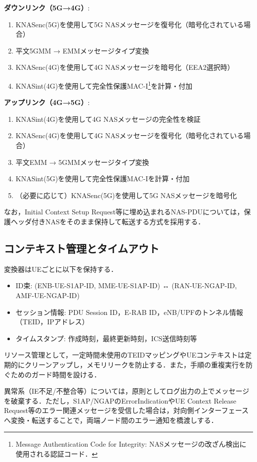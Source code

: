 \textbf{ダウンリンク（5G→4G）}:
\begin{enumerate}
\item KNASenc(5G)を使用して5G NASメッセージを復号化（暗号化されている場合）
\item 平文5GMM → EMMメッセージタイプ変換
\item KNASenc(4G)を使用して4G NASメッセージを暗号化（EEA2選択時）
\item KNASint(4G)を使用して完全性保護MAC-I\footnote{Message Authentication Code for Integrity: NASメッセージの改ざん検出に使用される認証コード．}を計算・付加
\end{enumerate}

\textbf{アップリンク（4G→5G）}:
\begin{enumerate}
\item KNASint(4G)を使用して4G NASメッセージの完全性を検証
\item KNASenc(4G)を使用して4G NASメッセージを復号化（暗号化されている場合）
\item 平文EMM → 5GMMメッセージタイプ変換
\item KNASint(5G)を使用して完全性保護MAC-Iを計算・付加
\item （必要に応じて）KNASenc(5G)を使用して5G NASメッセージを暗号化
\end{enumerate}

なお，Initial Context Setup Request等に埋め込まれるNAS-PDUについては，保護ヘッダ付きNASをそのまま保持して転送する方式を採用する．

\subsection{コンテキスト管理とタイムアウト}
\label{subsec:context_management}
変換器はUEごとに以下を保持する．
\begin{itemize}
  \item ID束: (ENB-UE-S1AP-ID, MME-UE-S1AP-ID) ↔ (RAN-UE-NGAP-ID, AMF-UE-NGAP-ID)
  \item セッション情報: PDU Session ID，E-RAB ID，eNB/UPFのトンネル情報（TEID，IPアドレス）
  \item タイムスタンプ: 作成時刻，最終更新時刻，ICS送信時刻等
\end{itemize}
リソース管理として，一定時間未使用のTEIDマッピングやUEコンテキストは定期的にクリーンアップし，メモリリークを防止する．また，手順の重複実行を防ぐためのガード時間を設ける．

異常系（IE不足/不整合等）については，原則としてログ出力の上でメッセージを破棄する．ただし，S1AP/NGAPのErrorIndicationやUE Context Release Request等のエラー関連メッセージを受信した場合は，対向側インターフェースへ変換・転送することで，両端ノード間のエラー通知を橋渡しする．

